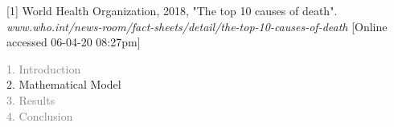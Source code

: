 \begin{frame}
\vspace{0.2cm}
\tiny [1] World Health Organization, 2018, "The top 10 causes of death".
\textit{www.who.int/news-room/fact-sheets/detail/the-top-10-causes-of-death}
[Online accessed 06-04-20 08:27pm]



\end{frame}



\begin{frame}
  \vspace{-1cm}
  \textcolor{gray}{1. Introduction}\\[0.1cm]
  2. Mathematical Model\\[0.1cm]
  \textcolor{gray}{3. Results}\\[0.1cm]
  \textcolor{gray}{4. Conclusion}
\end{frame}



